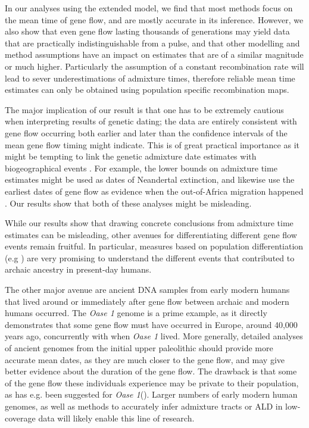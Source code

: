 \documentclass[]{article}
\begin{document}
In our analyses using the extended model, we find that most methods focus on the mean time of gene flow, and are mostly accurate in its inference. However, we also show that even gene flow lasting thousands of generations may yield data that are practically indistinguishable from a pulse, and that other modelling and method assumptions have an impact on estimates that are of a similar magnitude or much higher. Particularly the assumption of a constant recombination rate will lead to sever underestimations of admixture times, therefore reliable mean time estimates can only be obtained using population specific recombination maps.

The major implication of our result is that one has to be extremely cautious when interpreting results of genetic dating; the data are entirely consistent with gene flow occurring both earlier and later than the confidence intervals of the mean gene flow timing might indicate. This is of great practical importance as it might be tempting to link the genetic admixture date estimates with biogeographical events \cite{sankararaman_date_2012,lazaridis_genomic_2016,jacobs_multiple_2019,vyas_analyses_2019,douka_age_2019}. For example, the lower bounds on admixture time estimates might be used as dates of Neandertal extinction, and likewise use the earliest dates of gene flow as evidence when the out-of-Africa migration happened \citep{sankararaman_date_2012}. Our results show that both of these analyses might be misleading.


While our results show that drawing concrete conclusions from admixture time estimates can be misleading, other avenues for differentiating different gene flow events remain fruitful.
In particular, measures based on population differentiation (e.g \cite{browning_analysis_2018,wall_higher_2013,villanea_multiple_2019,jacobs_multiple_2019}) are very promising to understand the different events that contributed to archaic ancestry in present-day humans. 

The other major avenue are ancient DNA samples from early modern humans that lived around or immediately after gene flow between archaic and modern humans occurred. The \textit{Oase 1} genome is a prime example, as it directly demonstrates that some gene flow must have occurred in Europe, around 40,000 years ago, concurrently with when \textit{Oase 1} lived. More generally, detailed analyses of ancient genomes from the initial upper paleolithic should provide more accurate mean dates, as they are much closer to the gene flow, and may give better evidence about the duration of the gene flow. The drawback is that some of the gene flow these individuals experience may be private to their population, as has e.g. been suggested for \textit{Oase 1}(\cite{fu_genome_2014}). Larger numbers of early modern human genomes, as well as methods to accurately infer admixture tracts or ALD in low-coverage data will likely enable this line of research. 
\end{document}
